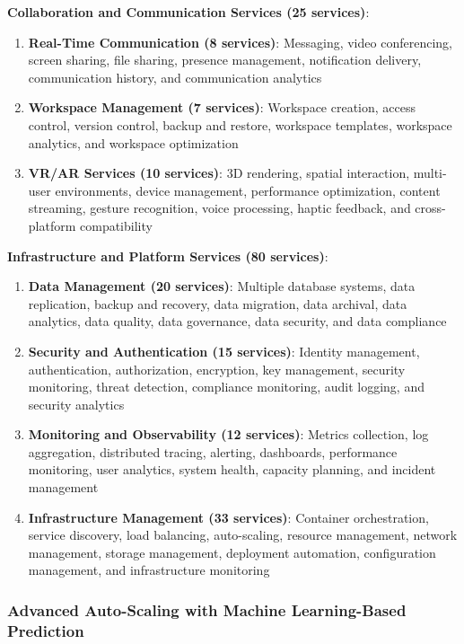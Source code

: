 \documentclass[10pt,twocolumn]{article}
\begin{document}
\textbf{Collaboration and Communication Services (25 services)}:
\begin{enumerate}
    \item \textbf{Real-Time Communication (8 services)}: Messaging, video conferencing, screen sharing, file sharing, presence management, notification delivery, communication history, and communication analytics
    
    \item \textbf{Workspace Management (7 services)}: Workspace creation, access control, version control, backup and restore, workspace templates, workspace analytics, and workspace optimization
    
    \item \textbf{VR/AR Services (10 services)}: 3D rendering, spatial interaction, multi-user environments, device management, performance optimization, content streaming, gesture recognition, voice processing, haptic feedback, and cross-platform compatibility
\end{enumerate}

\textbf{Infrastructure and Platform Services (80 services)}:
\begin{enumerate}
    \item \textbf{Data Management (20 services)}: Multiple database systems, data replication, backup and recovery, data migration, data archival, data analytics, data quality, data governance, data security, and data compliance
    
    \item \textbf{Security and Authentication (15 services)}: Identity management, authentication, authorization, encryption, key management, security monitoring, threat detection, compliance monitoring, audit logging, and security analytics
    
    \item \textbf{Monitoring and Observability (12 services)}: Metrics collection, log aggregation, distributed tracing, alerting, dashboards, performance monitoring, user analytics, system health, capacity planning, and incident management
    
    \item \textbf{Infrastructure Management (33 services)}: Container orchestration, service discovery, load balancing, auto-scaling, resource management, network management, storage management, deployment automation, configuration management, and infrastructure monitoring
\end{enumerate}

\subsubsection{Advanced Auto-Scaling with Machine Learning-Based Prediction}
\end{document}
